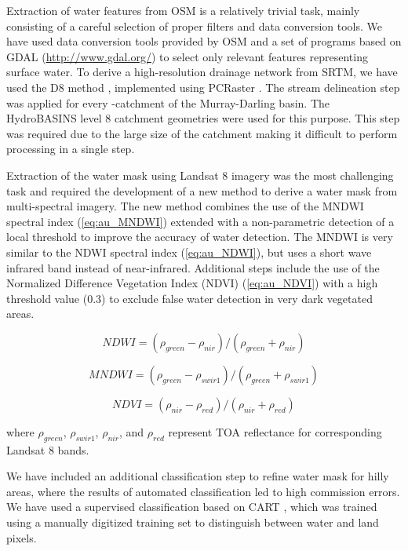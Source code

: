 Extraction of water features from OSM is a relatively trivial task, mainly consisting of a careful selection of proper filters and data conversion tools. We have used data conversion tools provided by OSM and a set of programs based on GDAL (\url{http://www.gdal.org/}) to select only relevant features representing surface water. 
To derive a high-resolution drainage network from SRTM, we have used the D8 method \citep{OCallaghan1984}, implemented using PCRaster \citep{Karssenberg2010}. The stream delineation step was applied for every -catchment of the Murray-Darling basin. The HydroBASINS level 8 catchment geometries were used for this purpose. This step was required due to the large size of the catchment making it difficult to perform processing in a single step.

Extraction of the water mask using Landsat 8 imagery was the most challenging task and required the development of a new method to derive a water mask from multi-spectral imagery. The new method combines the use of the MNDWI spectral index (\ref{eq:au_MNDWI}) extended with a non-parametric detection of a local threshold to improve the accuracy of water detection. The MNDWI is very similar to the NDWI spectral index (\ref{eq:au_NDWI}), but uses a short wave infrared band instead of near-infrared. Additional steps include the use of the Normalized Difference Vegetation Index (NDVI) \citep{Tucker1979} (\ref{eq:au_NDVI}) with a high threshold value (0.3) to exclude false water detection in very dark vegetated areas. 

\begin{equation}
NDWI = \left(\rho_{green}-\rho_{nir} \right) / \left(\rho_{green} + \rho_{nir} \right)
\label{eq:au_NDWI}
\end{equation}

\begin{equation}
MNDWI = \left(\rho_{green}-\rho_{swir1} \right) / \left(\rho_{green} + \rho_{swir1} \label{eq:au_MNDWI}
\right)
\end{equation}

\begin{equation}
NDVI=\left(\rho_{nir} - \rho_{red}\right) / \left(\rho_{nir} + \rho_{red} \right)
\label{eq:au_NDVI}
\end{equation}

where $\rho_{green}$, $\rho_{swir1}$, $\rho_{nir}$, and $\rho_{red}$ represent TOA reflectance for corresponding Landsat 8 bands.

We have included an additional classification step to refine water mask for hilly areas, where the results of automated classification led to high commission errors. We have used a supervised classification based on CART \citep{Breiman1984}, which was trained using a manually digitized training set to distinguish between water and land pixels. 

